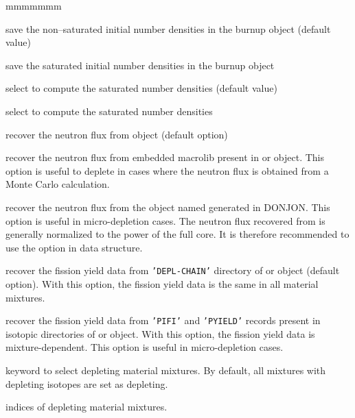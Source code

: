 \begin{ListeDeDescription}{mmmmmmm}
\item[\moc{NSAT}] save the non--saturated initial number densities in the {\sc burnup}
object  (default value)

\item[\moc{SAT}]  save the saturated initial number densities in the {\sc burnup}
object 

\item[\moc{NODI}]  select  to compute the saturated number densities
(default value)

\item[\moc{DIRA}]  select  to compute the saturated number densities

\item[\moc{FLUX\_FLUX}]  recover the neutron flux from  object (default option)

\item[\moc{FLUX\_MAC}]  recover the neutron flux from embedded macrolib present in  or 
object. This option is useful to deplete in cases where the neutron flux is obtained from a Monte Carlo
calculation.

\item[\moc{FLUX\_POW}]  recover the neutron flux from the  object named  generated in DONJON. This option is useful in
micro-depletion cases. The neutron flux recovered from  is generally normalized to the power of the full core. It is therefore
recommended to use the  option in  data structure.

\item[\moc{CHAIN}]  recover the fission yield data from {\tt 'DEPL-CHAIN'} directory of  or 
object (default option). With this option, the fission yield data is the same in all material mixtures.

\item[\moc{PIFI}]  recover the fission yield data from {\tt 'PIFI'} and {\tt 'PYIELD'} records present in isotopic directories
of  or  object. With this option, the fission yield data is mixture-dependent. This option is useful
in micro-depletion cases.

\item[\moc{MIXB}]  keyword to select depleting material mixtures. By default, all mixtures
with depleting isotopes are set as depleting.

\item[\dusa{mixbrn}] indices of depleting material mixtures.


\end{ListeDeDescription}
